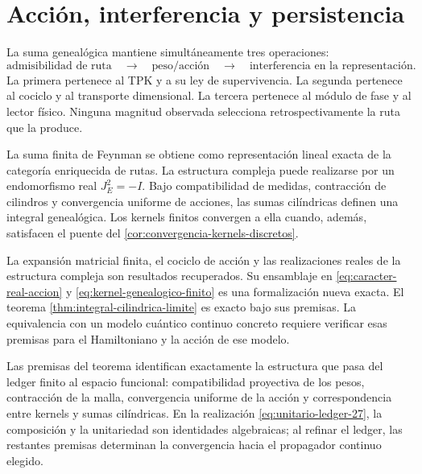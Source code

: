 \section{Acción, interferencia y persistencia}

La suma genealógica mantiene simultáneamente tres operaciones:
\[
 \text{admisibilidad de ruta}
 \quad\longrightarrow\quad
 \text{peso/acción}
 \quad\longrightarrow\quad
 \text{interferencia en la representación}.
\]
La primera pertenece al TPK y a su ley de supervivencia. La segunda pertenece
al cociclo y al transporte dimensional. La tercera pertenece al módulo de
fase y al lector físico. Ninguna magnitud observada selecciona
retrospectivamente la ruta que la produce.

\begin{resultbox}
La suma finita de Feynman se obtiene como representación lineal exacta de la
categoría enriquecida de rutas. La estructura compleja puede realizarse por un
endomorfismo real \(J_E^2=-I\). Bajo compatibilidad de medidas, contracción de
cilindros y convergencia uniforme de acciones, las sumas cilíndricas definen
una integral genealógica. Los kernels finitos convergen a ella cuando,
además, satisfacen el puente del
\cref{cor:convergencia-kernels-discretos}.
\end{resultbox}

\begin{statusbox}
La expansión matricial finita, el cociclo de acción y las realizaciones reales
de la estructura compleja son resultados recuperados. Su ensamblaje en
\eqref{eq:caracter-real-accion} y \eqref{eq:kernel-genealogico-finito} es una
formalización nueva exacta. El teorema \ref{thm:integral-cilindrica-limite} es
exacto bajo sus premisas. La equivalencia con un modelo cuántico continuo
concreto requiere verificar esas premisas para el Hamiltoniano y la acción de
ese modelo.
\end{statusbox}

Las premisas del teorema identifican exactamente la estructura que pasa del
ledger finito al espacio funcional: compatibilidad proyectiva de los pesos,
contracción de la malla, convergencia uniforme de la acción y correspondencia
entre kernels y sumas cilíndricas. En la realización
\eqref{eq:unitario-ledger-27}, la composición y la unitariedad son identidades
algebraicas; al refinar el ledger, las restantes premisas determinan la
convergencia hacia el propagador continuo elegido.
